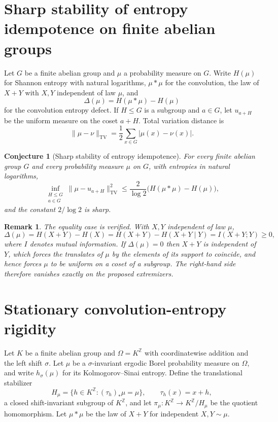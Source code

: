 \documentclass[11pt]{article}
\newtheorem{conjecture}{Conjecture}
\newtheorem{remark}{Remark}
\theoremstyle{definition}
\newcommand{\Z}{\mathbb Z}
\providecommand{\Z}{\mathbb Z}
\begin{document}
\section{Sharp stability of entropy idempotence on finite abelian groups}

Let $G$ be a finite abelian group and $\mu$ a probability measure on
$G$.  Write $H(\mu)$ for Shannon entropy with natural logarithms,
$\mu*\mu$ for the convolution, the law of $X+Y$ with $X,Y$
independent of law $\mu$, and
\[
\Delta(\mu)=H(\mu*\mu)-H(\mu)
\]
for the convolution entropy defect.  If $H\le G$ is a subgroup and
$a\in G$, let $u_{a+H}$ be the uniform measure on the coset $a+H$.
Total variation distance is
\[
\|\mu-\nu\|_{\mathrm{TV}}=\frac12\sum_{x\in G}|\mu(x)-\nu(x)| .
\]

\begin{conjecture}[Sharp stability of entropy idempotence]\label{t5}
For every finite abelian group $G$ and every probability measure
$\mu$ on $G$, with entropies in natural logarithms,
\[
\inf_{\substack{H\le G\\a\in G}}
\|\mu-u_{a+H}\|_{\mathrm{TV}}^2
\le
\frac{2}{\log2}\bigl(H(\mu*\mu)-H(\mu)\bigr),
\]
and the constant $2/\log2$ is sharp.
\end{conjecture}

\begin{remark}\label{t5:equality}
The equality case is verified.  With $X,Y$ independent of law $\mu$,
\[
\Delta(\mu)=H(X+Y)-H(X)=H(X+Y)-H(X+Y\mid Y)=I(X+Y;Y)\ge0,
\]
where $I$ denotes mutual information.  If $\Delta(\mu)=0$ then $X+Y$
is independent of $Y$, which forces the translates of $\mu$ by the
elements of its support to coincide, and hence forces $\mu$ to be
uniform on a coset of a subgroup.  The right-hand side therefore
vanishes exactly on the proposed extremizers.
\end{remark}


\section{Stationary convolution-entropy rigidity}

Let $K$ be a finite abelian group and $\Omega=K^{\Z}$ with coordinatewise addition and the left shift $\sigma$. Let $\mu$ be a $\sigma$-invariant ergodic Borel probability measure on $\Omega$, and write
$h_\sigma(\mu)$ for its Kolmogorov--Sinai entropy.  Define the
translational stabilizer
\[
H_\mu=\{h\in K^{\Z}:(\tau_h)_*\mu=\mu\},
\qquad\tau_h(x)=x+h,
\]
a closed shift-invariant subgroup of $K^{\Z}$, and let
$\pi_\mu:K^{\Z}\to K^{\Z}/H_\mu$ be the quotient homomorphism.  Let
$\mu*\mu$ be the law of $X+Y$ for independent $X,Y\sim\mu$.
\end{document}

